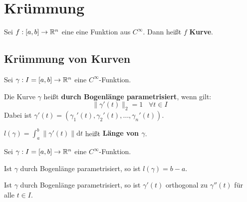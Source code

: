 \chapter{Krümmung}

\begin{definition}
  Sei $f: [a, b] \rightarrow \mathbb{R}^n$ eine eine Funktion aus $C^\infty$.
  Dann heißt $f$ \textbf{Kurve}.
\end{definition}

\section{Krümmung von Kurven}\label{sec:Kurvenkrümmung}
\begin{definition}%
    Sei $\gamma: I = [a, b] \rightarrow \mathbb{R}^n$ eine $C^\infty$-Funktion.
    
    \begin{defenum}
        \item Die Kurve $\gamma$ heißt 
              \textbf{durch Bogenlänge parametrisiert},
              wenn gilt:
              \[\|\gamma'(t)\|_2 = 1 \;\;\; \forall t \in I\]
              Dabei ist $\gamma'(t) = \left (\gamma_1'(t), \gamma_2'(t), \dots, \gamma_n'(t) \right)$.
        \item $l(\gamma) = \int_a^b \|\gamma'(t)\| \mathrm{d} t$ heißt
              \textbf{Länge von $\gamma$}.
    \end{defenum}    
\end{definition}

\begin{bemerkung}%
    Sei $\gamma: I = [a, b] \rightarrow \mathbb{R}^n$ eine $C^\infty$-Funktion.

    \begin{bemenum}
        \item Ist $\gamma$ durch Bogenlänge parametrisiert, so ist $l(\gamma) = b-a$.
        \item \label{bem:16.1d} Ist $\gamma$ durch Bogenlänge parametrisiert, so ist 
              $\gamma'(t)$ orthogonal zu $\gamma''(t)$ für alle $t \in I$.
    \end{bemenum}
\end{bemerkung}

